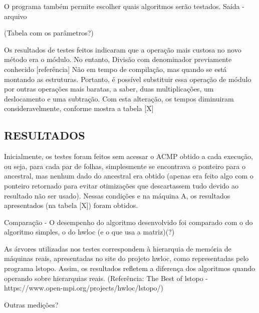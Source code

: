 O programa também permite escolher quais algoritmos serão testados.
Saída - arquivo

(Tabela com os parâmetros?)


Os resultados de testes feitos indicaram que a operação mais custosa no novo método era o módulo.
No entanto, 
Divisão com denominador previamente conhecido [referência]
Não em tempo de compilação, mas quando se está montando as estruturas.
Portanto, é possível substituir essa operação de módulo por outras operações mais baratas, a saber, duas multiplicações, um deslocamento e uma subtração.
Com esta alteração, os tempos diminuiram consideravelmente, conforme mostra a tabela [X]


\subsection{RESULTADOS}

Inicialmente, os testes foram feitos sem acessar o ACMP obtido a cada execução, ou seja, para cada par de folhas, simplesmente se encontrava o ponteiro para o ancestral, mas nenhum dado do ancestral era obtido (apenas era feito algo com o ponteiro retornado para evitar otimizações que descartassem tudo devido ao resultado não ser usado).
Nessas condições e na máquina A, os resultados apresentados (na tabela [X]) foram obtidos.

Comparação - O desempenho do algoritmo desenvolvido foi comparado com o do algoritmo simples, o do hwloc (e o que usa a matriz)(?)

As árvores utilizadas nos testes correspondem à hierarquia de memória de máquinas reais, apresentadas no site do projeto hwloc, como representadas pelo programa lstopo.
Assim, os resultados refletem a diferença dos algoritmos quando operando sobre hierarquias reais.
(Referência: The Best of lstopo - https://www.open-mpi.org/projects/hwloc/lstopo/)

Outras medições?
